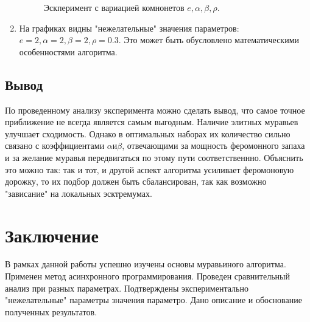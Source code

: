 \documentclass[a4paper, 12pt]{article}
\begin{document}
\begin{enumerate}
\begin{figure}[h]
			\caption{Эскперимент с вариацией комнонетов $e, \alpha, \beta, \rho$.}
		\end{figure}
		\item На графиках видны "нежелательные" значения параметров: $e = 2, \alpha = 2, \beta = 2, \rho = 0.3$. Это может быть обусловлено математическими особенностями алгоритма.
	\end{enumerate}  
	
	\subsection{Вывод}
	\hspace*{5mm} По проведенному анализу  эксперимента можно сделать вывод, что самое точное приближение не всегда является самым выгодным. Наличие элитных муравьев улучшает сходимость. Однако в оптимальных наборах их количество сильно связано с коэффициентами $\alpha и \beta$, отвечающими за мощность феромонного запаха и за желание муравья передвигаться по этому пути соответственнно. Объяснить это можно так: так и тот, и другой аспект алгоритма усиливает феромоновую дорожку, то их подбор должен быть сбалансирован, так как возможно "зависание" на локальных эсктремумах.



	\newpage
	\section*{Заключение}
	\hspace*{5mm} В рамках данной работы успешно изучены основы муравьиного алгоритма. Применен метод асинхронного программирования. Проведен сравнительный анализ при разных параметрах. Подтверждены экспериментально "нежелательные" параметры значения параметро. Дано описание и обоснование полученных результатов.   


\clearpage
\newpage

\printbibliography
\end{document}
